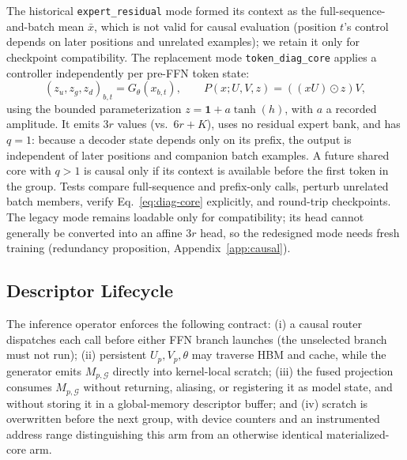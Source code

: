 The historical \texttt{expert\_residual} mode formed its context as the
full-sequence-and-batch mean $\bar x$, which is not valid for causal
evaluation (position $t$'s control depends on later positions and unrelated
examples); we retain it only for checkpoint compatibility. The replacement
mode \texttt{token\_diag\_core} applies a controller independently per
pre-FFN token state:
\begin{equation}
(z_u,z_g,z_d)_{b,t}=G_\theta(x_{b,t}),\qquad
P(x;U,V,z)=((xU)\odot z)V,
\label{eq:diag-core}
\end{equation}
using the bounded parameterization $z=\mathbf 1+a\tanh(h)$, with $a$ a
recorded amplitude. It emits $3r$ values (vs.\ $6r+K$), uses no residual
expert bank, and has $q=1$: because a decoder state depends only on its
prefix, the output is independent of later positions and companion batch
examples. A future shared core with $q>1$ is causal only if its context is
available before the first token in the group. Tests compare full-sequence
and prefix-only calls, perturb unrelated batch members, verify
Eq.~\eqref{eq:diag-core} explicitly, and round-trip checkpoints. The legacy
mode remains loadable only for compatibility; its head cannot generally be
converted into an affine $3r$ head, so the redesigned mode needs fresh
training (redundancy proposition, Appendix~\ref{app:causal}).

\subsection{Descriptor Lifecycle}

The inference operator enforces the following contract:
(i) a causal router dispatches each call before either FFN branch launches
(the unselected branch must not run); (ii) persistent $U_p,V_p,\theta$ may
traverse HBM and cache, while the generator emits $M_{p,\mathcal G}$ directly
into kernel-local scratch; (iii) the fused projection consumes $M_{p,\mathcal G}$
without returning, aliasing, or registering it as model state, and without
storing it in a global-memory descriptor buffer; and (iv) scratch is
overwritten before the next group, with device counters and an instrumented
address range distinguishing this arm from an otherwise identical
materialized-core arm.

